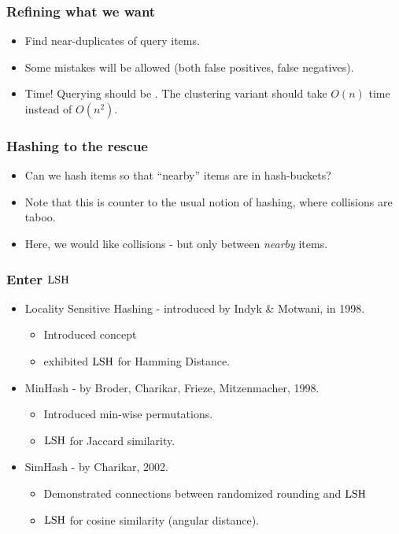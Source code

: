 \documentclass{beamer}
\begin{document}
\begin{frame}
\frametitle{Refining what we want}
\begin{itemize}
\item Find near-duplicates of query items.
\item Some mistakes will be allowed (both false positives, false negatives). 
\item Time! Querying should be . The clustering variant should take $O(n)$ time instead of $O(n^2)$. 
\end{itemize}
\end{frame}


\begin{frame}
\frametitle{Hashing to the rescue}
\begin{itemize}
\item Can we hash items so that ``nearby'' items are in  hash-buckets?
\item Note that this is counter to the usual notion of hashing, where collisions are taboo. 
\item Here, we would like collisions - but only between {\em nearby} items.
\end{itemize}
\end{frame}

\begin{frame}
\frametitle{Enter $\mathrm{LSH}$}
\begin{itemize}
\item Locality Sensitive Hashing - introduced by Indyk \& Motwani, in 1998. 
\begin{itemize}
\item Introduced concept
\item exhibited $\mathrm{LSH}$ for Hamming Distance.
\end{itemize}
\pause
\item MinHash - by Broder, Charikar, Frieze, Mitzenmacher, 1998.
\begin{itemize}
\item Introduced min-wise permutations.
\item $\mathrm{LSH}$ for Jaccard similarity.
\end{itemize}\pause
\item SimHash - by Charikar, 2002. 
\begin{itemize}
\item Demonstrated connections between randomized rounding and $\mathrm{LSH}$
\item $\mathrm{LSH}$ for cosine similarity (angular distance).
\end{itemize}
\end{itemize}
\end{frame}
\end{document}
